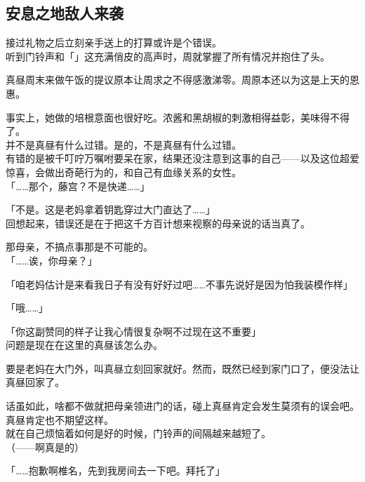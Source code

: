 \subsection{安息之地敌人来袭}

接过礼物之后立刻亲手送上的打算或许是个错误。\\

听到门铃声和「」这充满俏皮的高声时，周就掌握了所有情况并抱住了头。\\

\vspace{2\baselineskip}

真昼周末来做午饭的提议原本让周求之不得感激涕零。周原本还以为这是上天的恩惠。

事实上，她做的培根意面也很好吃。浓酱和黑胡椒的刺激相得益彰，美味得不得了。\\

并不是真昼有什么过错。是的，不是真昼有什么过错。\\

有错的是被千叮咛万嘱咐要呆在家，结果还没注意到这事的自己——以及这位超爱惊喜，会做出奇葩行为的，和自己有血缘关系的女性。\\

「……那个，藤宫？不是快递……」

「不是。这是老妈拿着钥匙穿过大门直达了……」\\

回想起来，错误还是在于把这千方百计想来视察的母亲说的话当真了。

那母亲，不搞点事那是不可能的。\\

「……诶，你母亲？」

「咱老妈估计是来看我日子有没有好好过吧……不事先说好是因为怕我装模作样」

「哦……」

「你这副赞同的样子让我心情很复杂啊不过现在这不重要」\\

问题是现在在这里的真昼该怎么办。

要是老妈在大门外，叫真昼立刻回家就好。然而，既然已经到家门口了，便没法让真昼回家了。

话虽如此，啥都不做就把母亲领进门的话，碰上真昼肯定会发生莫须有的误会吧。真昼肯定也不期望这样。\\

就在自己烦恼着如何是好的时候，门铃声的间隔越来越短了。\\

（——啊真是的）

「……抱歉啊椎名，先到我房间去一下吧。拜托了」

